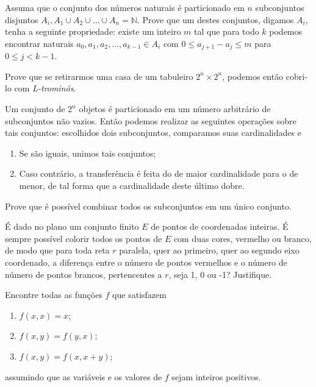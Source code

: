 \begin{questao}
  Assuma que o conjunto dos números naturais é particionado em $n$ subconjuntos
  disjuntos $A_i,A_1 \cup A_2 \cup \ldots \cup A_n = \mathbb{N}$. Prove que um
  destes conjuntos, digamos $A_i$, tenha a seguinte propriedade: existe um
  inteiro $m$ tal que para todo $k$ podemos encontrar naturais
  $a_0,a_1,a_2,\ldots,a_{k-1} \in A_i$ com $0 \leq a_{j+1}-a_j \leq m$ para $0
  \leq j < k-1$.
\end{questao}

\begin{questao}
  Prove que se retirarmos uma casa de um tabuleiro $2^n \times 2^n$, podemos
  então cobri-lo com {\it L-trominós}.
\end{questao}

\begin{questao}
  Um conjunto de $2^n$ objetos é particionado em um número arbitrário de
  subconjuntos não vazios. Então podemos realizar as seguintes operações sobre
  tais conjuntos: escolhidos dois subconjuntos, comparamos suas cardinalidades e

  \begin{enumerate}

  \item Se são iguais, unimos tais conjuntos;

  \item Caso contrário, a transferência é feita do de maior cardinalidade para o
    de menor, de tal forma que a cardinalidade deste último dobre.
  \end{enumerate}

  Prove que é possível combinar todos os subconjuntos em um único conjunto.
\end{questao}

\begin{questao}
  É dado no plano um conjunto finito $E$ de pontos de coordenadas inteiras. É
  sempre possível colorir todos os pontos de $E$ com duas cores, vermelho ou
  branco, de modo que para toda reta $r$ paralela, quer ao primeiro, quer ao
  segundo eixo coordenado, a diferença entre o número de pontos vermelhos e o
  número de número de pontos brancos, pertencentes a $r$, seja 1, 0 ou -1?
  Justifique.
\end{questao}

\begin{questao}
  Encontre todas as funções $f$ que satisfazem
  \begin{enumerate}

  \item $f(x,x) = x$;

  \item $f(x,y) = f(y,x)$;

  \item $f(x,y) = f(x,x+y)$;
  \end{enumerate}

  assumindo que as variáveis e os valores de $f$ sejam inteiros positivos.
\end{questao}

